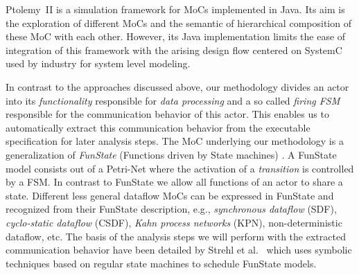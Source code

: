Ptolemy~II \cite{ptolemyII} is a simulation framework for MoCs implemented in Java.
Its aim is the exploration of different MoCs and the semantic of hierarchical composition of these MoC with each other.
However, its Java implementation limits the ease of integration of this framework with the arising design flow centered on SystemC used by industry for system level modeling.

In contrast to the approaches discussed above, our methodology divides an actor into its \emph{functionality} responsible for \emph{data processing} and a so called \emph{firing FSM} responsible for the communication behavior of this actor.
This enables us to automatically extract this communication behavior from the executable specification for later analysis steps.
The MoC underlying our methodology is a generalization of \emph{FunState} (Functions driven by State machines) \cite{stgzet:2001}.
A FunState model consists out of a Petri-Net where the activation of a \emph{transition} is controlled by a FSM.
In contrast to FunState we allow all functions of an actor to share a state.
Different less general dataflow MoCs can be expressed in FunState and recognized from their FunState description, e.g., \emph{synchronous dataflow} (SDF), \emph{cyclo-static dataflow} (CSDF), \emph{Kahn process networks} (KPN), non-deterministic dataflow, etc.
The basis of the analysis steps we will perform with the extracted communication behavior have been detailed by Strehl et al.~\cite{strehl:2000} which uses symbolic techniques based on regular state machines \cite{tts:2000} to schedule FunState models.

